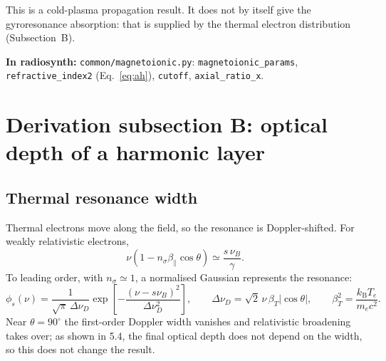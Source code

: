 \documentclass[11pt,a4paper]{article}
\newcommand{\kB}{k_\mathrm{B}}
\newcommand{\nuB}{\nu_B}
\newcommand{\code}[1]{\texttt{#1}}
\newcommand{\incode}[1]{\par{\small\color{head!80!black}\textbf{In radiosynth:} #1}\par}
\begin{document}
This is a cold-plasma propagation result. It does not by itself give the gyroresonance
absorption: that is supplied by the thermal electron distribution (Subsection~B).
\incode{\code{common/magnetoionic.py}: \code{magnetoionic\_params}, \code{refractive\_index2}
(Eq.~\ref{eq:ah}), \code{cutoff}, \code{axial\_ratio\_x}.}

\section{Derivation subsection B: optical depth of a harmonic layer}
\subsection{Thermal resonance width}
Thermal electrons move along the field, so the resonance is Doppler-shifted. For weakly
relativistic electrons,
\begin{equation}
  \nu\left(1-n_\sigma\beta_\parallel\cos\theta\right)\simeq\frac{s\,\nuB}{\gamma}.
\end{equation}
To leading order, with $n_\sigma\simeq1$, a normalised Gaussian represents the resonance:
\begin{equation}
  \phi_s(\nu)=\frac{1}{\sqrt\pi\,\Delta\nu_D}\exp\!\left[-\frac{(\nu-s\nuB)^2}{\Delta\nu_D^2}\right],
  \qquad
  \Delta\nu_D=\sqrt2\,\nu\,\beta_T|\cos\theta|,\qquad \beta_T^2=\frac{\kB T_e}{m_ec^2}.
\end{equation}
Near $\theta=90^\circ$ the first-order Doppler width vanishes and relativistic broadening takes over;
as shown in 5.4, the final optical depth does not depend on the width, so this does not change
the result.
\end{document}
